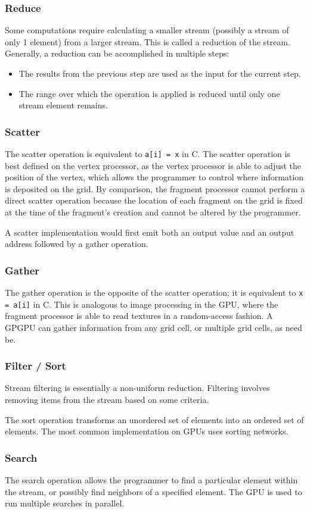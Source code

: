 \subsubsection{Reduce}
Some computations require calculating a smaller stream (possibly a stream of only 1 element) from a larger stream. This is called a reduction of the stream. Generally, a reduction can be accomplished in multiple steps: \begin{itemize}
\item The results from the previous step are used as the input for the current step.
\item The range over which the operation is applied is reduced until only one stream element remains.
\end{itemize}

\subsubsection{Scatter}
The scatter operation is equivalent to \texttt{a[i] = x} in C. The scatter operation is best defined on the vertex processor, as the vertex processor is able to adjust the position of the vertex, which allows the programmer to control where information is deposited on the grid. By comparison, the fragment processor cannot perform a direct scatter operation because the location of each fragment on the grid is fixed at the time of the fragment's creation and cannot be altered by the programmer.

A scatter implementation would first emit both an output value and an output address followed by a gather operation. 

\subsubsection{Gather}
The gather operation is the opposite of the scatter operation; it is equivalent to \texttt{x = a[i]} in C. This is analogous to image processing in the GPU, where the fragment processor is able to read textures in a random-access fashion. A GPGPU can gather information from any grid cell, or multiple grid cells, as need be.

\subsubsection{Filter / Sort}
Stream filtering is essentially a non-uniform reduction. Filtering involves removing items from the stream based on some criteria.

The sort operation transforms an unordered set of elements into an ordered set of elements. The most common implementation on GPUs uses sorting networks. 

\subsubsection{Search}
The search operation allows the programmer to find a particular element within the stream, or possibly find neighbors of a specified element. The GPU is used to run multiple searches in parallel. 
